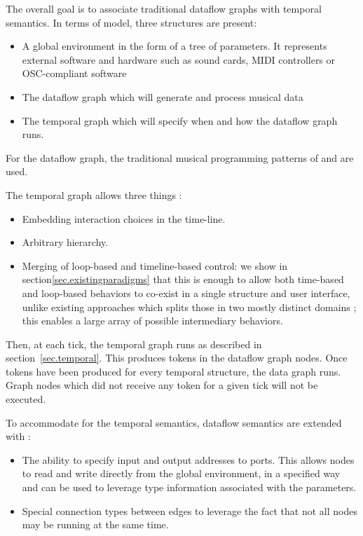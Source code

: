 \documentclass[applsci,article,submit,moreauthors,pdftex,10pt,a4paper]{mdpi}
\begin{document}
The overall goal is to associate traditional dataflow graphs with temporal semantics.
In terms of model, three structures are present: 
\begin{itemize}
    \item A global environment in the form of a tree of parameters. 
          It represents external software and hardware such as sound cards, MIDI controllers or OSC-compliant software
    \item The dataflow graph which will generate and process musical data
    \item The temporal graph which will specify when and how the dataflow graph runs.
\end{itemize}

For the dataflow graph, the traditional musical programming patterns of  and  are used.

The temporal graph allows three things :
\begin{itemize}
\item Embedding interaction choices in the time-line.
\item Arbitrary hierarchy.
\item Merging of loop-based and timeline-based control: we show in section\ref{sec.existingparadigms} that this is enough to allow both time-based and loop-based behaviors to co-exist in a single structure and user interface, unlike existing approaches which splits those in two mostly distinct domains ; this enables a large array of possible intermediary behaviors.
\end{itemize} 

Then, at each tick, the temporal graph runs as described in section~\ref{sec.temporal}.
This produces tokens in the dataflow graph nodes. 
Once tokens have been produced for every temporal structure, the data graph runs.
Graph nodes which did not receive any token for a given tick will not be executed.

To accommodate for the temporal semantics, dataflow semantics are extended with : 
\begin{itemize}
    \item The ability to specify input and output addresses to ports. 
          This allows nodes to read and write directly from the global environment, in a specified way and can be used to leverage type information associated with the parameters.
    \item Special connection types between edges to leverage the fact that not all nodes may be running at the same time.
\end{itemize}
 
\end{document}
